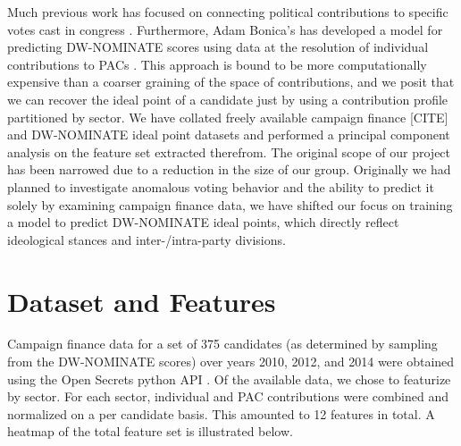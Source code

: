 \documentclass[12]{article}
\begin{document}
\noindent Much previous work has focused on connecting political contributions to specific votes cast in congress \cite{stratmann1991campaign,stratmann1995campaign}. Furthermore, Adam Bonica's has developed a model for predicting DW-NOMINATE scores using data at the resolution of individual contributions to PACs \cite{bonica2013ideology}. This approach is bound to be more computationally expensive than a coarser graining of the space of contributions, and we posit that we can recover the ideal point of a candidate just by using a contribution profile partitioned by sector. We have collated freely available campaign finance [CITE] and DW-NOMINATE ideal point \cite{DWWEB} datasets and performed a principal component analysis on the feature set extracted therefrom. The original scope of our project has been narrowed due to a reduction in the size of our group. Originally we had planned to investigate anomalous voting behavior and the ability to predict it solely by examining campaign finance data, we have shifted our focus on training a model to predict DW-NOMINATE ideal points, which directly reflect ideological stances and inter-/intra-party divisions.\\

\section*{Dataset and Features}

Campaign finance data for a set of 375 candidates (as determined by sampling from
the DW-NOMINATE scores) over years 2010, 2012, and 2014 were obtained using the 
Open Secrets python API \cite{open_secrets}. Of the available data, we chose to 
featurize by sector. For each sector, individual and PAC contributions were 
combined and normalized on a per candidate basis. This amounted to 12 features in total. A heatmap of the total feature 
set is illustrated below. 
\end{document}
